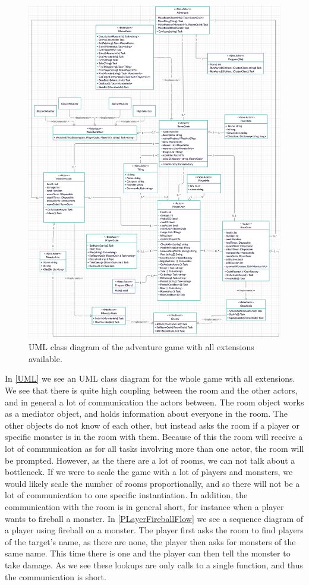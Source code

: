 \begin{figure}[H]
	\centering
	\includegraphics[width=\linewidth]{Materials/Adventuregame/ClassDiagram}
	\caption{UML class diagram of the adventure game with all extensions available.}
	\label{UML}
\end{figure}
In \autoref{UML} we see an UML class diagram for the whole game with all extensions. We see that there is quite high coupling between the room and the other actors, and in general a lot of communication the actors between. The room object works as a mediator object, and holds information about everyone in the room. The other objects do not know of each other, but instead asks the room if a player or specific monster is in the room with them. Because of this the room will receive a lot of communication as for all tasks involving more than one actor, the room will be prompted. However, as the there are a lot of rooms, we can not talk about a bottleneck. If we were to scale the game with a lot of players and monsters, we would likely scale the number of rooms proportionally, and so there will not be a lot of communication to one specific instantiation. In addition, the communication with the room is in general short, for instance when a player wants to fireball a monster. In \autoref{PLayerFireballFlow} we see a sequence diagram of a player using fireball on a monster. The player first asks the room to find players of the target's name, as there are none, the player then asks for monsters of the same name. This time there is one and the player can then tell the monster to take damage. As we see these lookups are only calls to a single function, and thus the communication is short.\\
